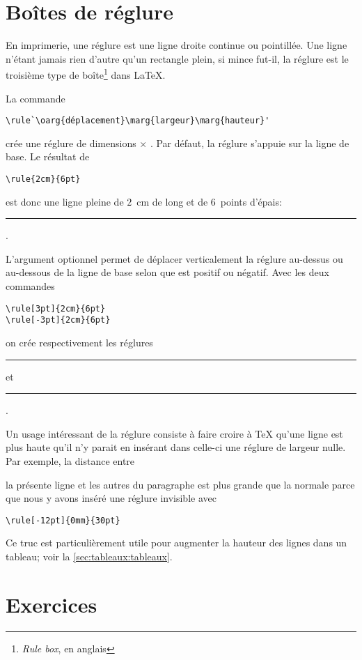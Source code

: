 \section{Boîtes de réglure}
\label{sec:boites:rulebox}

En imprimerie, une réglure est une ligne droite continue ou
pointillée. Une ligne n'étant jamais rien d'autre qu'un rectangle
plein, si mince fut-il, la réglure est le troisième type de
boîte\footnote{%
  \emph{Rule box}, en anglais} %
dans {\LaTeX}.

La commande
\begin{lstlisting}
\rule`\oarg{déplacement}\marg{largeur}\marg{hauteur}'
\end{lstlisting}
crée une réglure de dimensions  $\times$ .
Par défaut, la réglure s'appuie sur la ligne de base. Le résultat de
\begin{lstlisting}
\rule{2cm}{6pt}
\end{lstlisting}
est donc une ligne pleine de $2$~cm de long et de $6$~points d'épais:
\rule{2cm}{6pt}.

L'argument optionnel  permet de déplacer
verticalement la réglure au-dessus ou au-dessous de la ligne de base
selon que  est positif ou négatif. Avec les deux
commandes
\begin{lstlisting}
\rule[3pt]{2cm}{6pt}
\rule[-3pt]{2cm}{6pt}
\end{lstlisting}
on crée respectivement les réglures \rule[3pt]{2cm}{6pt} et
\rule[-3pt]{2cm}{6pt}.

Un usage intéressant de la réglure consiste à faire croire à {\TeX}
qu'une ligne est plus haute qu'il n'y parait en insérant dans celle-ci
une réglure de largeur nulle. Par exemple, la distance entre
\rule[-12pt]{0mm}{30pt}\relax la présente ligne et les autres du paragraphe est
plus grande que la normale parce que nous y avons inséré une réglure
invisible avec
\begin{lstlisting}
\rule[-12pt]{0mm}{30pt}
\end{lstlisting}
Ce truc est particulièrement utile pour augmenter la hauteur des
lignes dans un tableau; voir la \autoref{sec:tableaux:tableaux}.




\section{Exercices}
\label{sec:boites:exercices}

